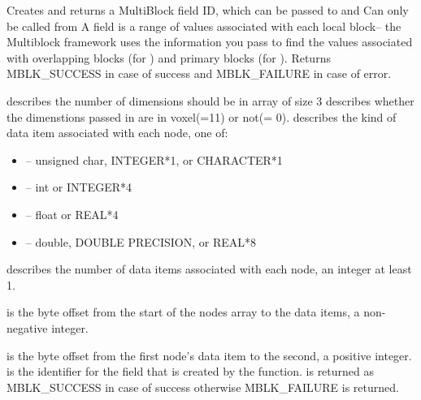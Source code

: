 \documentclass[10pt]{article}
\begin{document}

     Creates and returns a MultiBlock field ID, which can be passed to
 and   Can only be called from
  A field is a range of values associated with each local block--
the Multiblock framework uses the information you pass to find the values associated with overlapping blocks (for ) and primary blocks (for ). Returns MBLK\_SUCCESS in case of success and MBLK\_FAILURE in case of error.

      describes the number of dimensions should be in array of size 3
      describes whether the dimenstions passed in are in voxel(=11) or not(= 0).
      describes the kind of data item associated with each
     node, one of:

     \begin{itemize}
        \item {}-- unsigned char, INTEGER*1, or CHARACTER*1
        \item {}-- int or INTEGER*4
        \item {}-- float or REAL*4
        \item {}-- double, DOUBLE PRECISION, or REAL*8
     \end{itemize}

      describes the number of data items associated with each
     node, an integer at least 1.

      is the byte offset from the start of the nodes array to the
     data items, a non-negative integer.

      is the byte offset from the first node's data item to the
     second, a positive integer.
      is the identifier for the field that is created by the function.
      is returned as  MBLK\_SUCCESS in case of success otherwise MBLK\_FAILURE is returned.
\vspace{0.2in}
\end{document}
